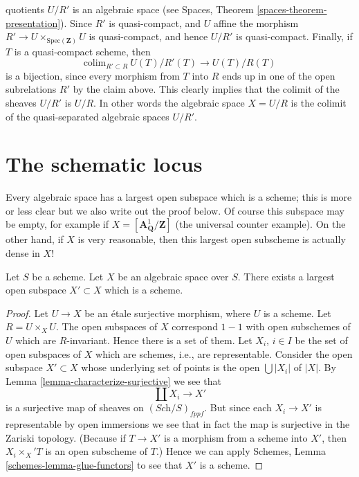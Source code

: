\begin{remark}
quotients $U/R'$ is an algebraic space
(see Spaces, Theorem \ref{spaces-theorem-presentation}).
Since $R'$ is quasi-compact, and $U$ affine the morphism
$R' \to U \times_{\text{Spec}(\mathbf{Z})} U$ is quasi-compact,
and hence $U/R'$ is quasi-compact. Finally, if $T$ is a quasi-compact
scheme, then
$$
\text{colim}_{R' \subset R}\ U(T)/R'(T) \longrightarrow U(T)/R(T)
$$
is a bijection, since every morphism from $T$ into $R$ ends up in one
of the open subrelations $R'$ by the claim above. This clearly implies
that the colimit of the sheaves $U/R'$ is $U/R$. In other words
the algebraic space $X = U/R$ is the colimit of the quasi-separated
algebraic spaces $U/R'$.
\end{remark}







\section{The schematic locus}
\label{section-schematic}

\noindent
Every algebraic space has a largest open subspace which is a
scheme; this is more or less clear but we also write out the proof below.
Of course this subspace may be empty, for example if
$X = [\mathbf{A}^1_{\mathbf{Q}}/\mathbf{Z}]$ (the universal
counter example). On the other hand, if $X$ is very reasonable, then
this largest open subscheme is actually dense in $X$!

\begin{lemma}
\label{lemma-subscheme}
Let $S$ be a scheme.
Let $X$ be an algebraic space over $S$.
There exists a largest open subspace $X' \subset X$ which is a scheme.
\end{lemma}

\begin{proof}
Let $U \to X$ be an \'etale surjective morphism, where $U$ is a scheme.
Let $R = U \times_X U$. The open subspaces of $X$ correspond $1 - 1$
with open subschemes of $U$ which are $R$-invariant. Hence there is a
set of them. Let $X_i$, $i \in I$ be the set of open subspaces
of $X$ which are schemes, i.e., are representable. Consider the
open subspace $X' \subset X$ whose underlying set of points is
the open $\bigcup |X_i|$ of $|X|$. By
Lemma \ref{lemma-characterize-surjective}
we see that
$$
\coprod X_i \longrightarrow X'
$$
is a surjective map of sheaves on $(\textit{Sch}/S)_{fppf}$.
But since each $X_i \to X'$ is representable by open immersions
we see that in fact the map is surjective in the Zariski
topology. (Because if $T \to X'$ is a morphism from a scheme
into $X'$, then $X_i \times_X' T$ is an open subscheme of $T$.)
Hence we can apply
Schemes, Lemma \ref{schemes-lemma-glue-functors}
to see that $X'$ is a scheme.
\end{proof}

